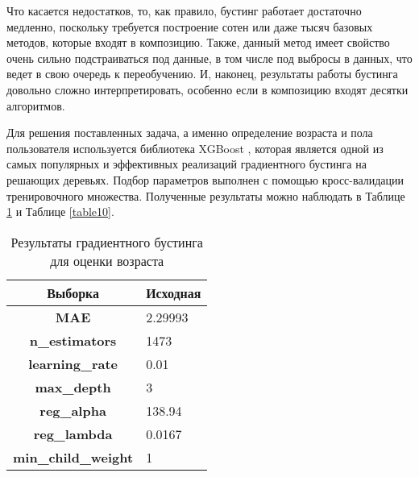 Что касается недостатков, то,  как правило, бустинг работает достаточно медленно, поскольку требуется построение сотен или даже тысяч базовых методов, которые входят в композицию. Также, данный метод имеет свойство очень сильно подстраиваться под данные, в том числе под выбросы в данных, что ведет в свою очередь к переобучению. И, наконец, результаты работы бустинга довольно сложно интерпретировать, особенно
если в композицию входят десятки алгоритмов.

Для решения поставленных задача, а именно определение возраста и пола пользователя используется библиотека XGBoost \cite{xgboost}, которая является одной из самых популярных и эффективных реализаций градиентного бустинга на решающих деревьях. Подбор параметров выполнен с помощью кросс-валидации тренировочного множества. Полученные результаты можно наблюдать в Таблице \ref{table9} и Таблице \ref{table10}.

\setlength\extrarowheight{8pt}
\begin{table}[h!]
\centering
\begin{tabular}{|c|l|}
\hline
\textbf{Выборка}            & Исходная \\ \hline
\textbf{MAE}                & 2.29993  \\ \hline
\textbf{n\_estimators}      & 1473     \\ \hline
\textbf{learning\_rate}     & 0.01     \\ \hline
\textbf{max\_depth}         & 3        \\ \hline
\textbf{reg\_alpha}         & 138.94   \\ \hline
\textbf{reg\_lambda}        & 0.0167   \\ \hline
\textbf{min\_child\_weight} & 1        \\ \hline
\end{tabular}
\caption{Результаты градиентного бустинга для оценки возраста}
\label{table9}
\end{table}

